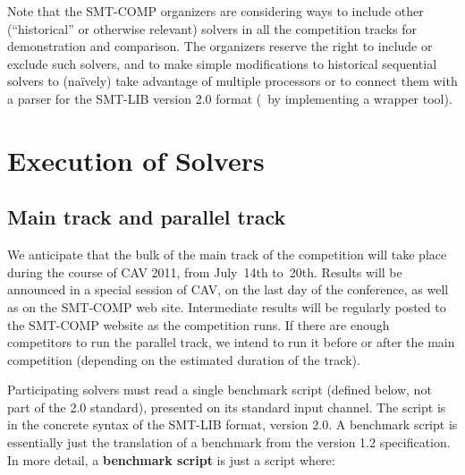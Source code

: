 \documentclass[12pt]{article}
\begin{document}
\medskip
\noindent
Note that the SMT-COMP organizers are considering ways to include
other (``historical'' or otherwise relevant) solvers in all the competition tracks for
demonstration and comparison.  The organizers reserve the right to
include or exclude such solvers, and to make simple modifications
to historical sequential solvers to (na\"ively) take advantage of
multiple processors 
or to connect them with a parser for the SMT-LIB version 2.0 format
(\eg\ by implementing a wrapper tool).

\section{Execution of Solvers}
\label{sec:exec}

\subsection{Main track and parallel track}
\label{sec:exec:main}

%
We anticipate that the bulk of the main track of the competition will take place during
the course of CAV 2011, from July~14th to~20th.  Results will be
announced in a special session of CAV, on the last day of the
conference, as well as on the SMT-COMP web site.  Intermediate results
will be regularly posted to the SMT-COMP website as the competition
runs.
%
If there are enough competitors to run the parallel track, we intend
to run it before or after the main competition (depending on the
estimated duration of the track).

%
Participating solvers must read a single benchmark script (defined
below, not part of the 2.0 standard), presented on its standard input
channel. The script is in the concrete syntax of the SMT-LIB format,
version 2.0.  A benchmark script is essentially just the translation
of a benchmark from the version 1.2 specification.  In more detail, a
\textbf{benchmark script} is just a script where:
\end{document}
